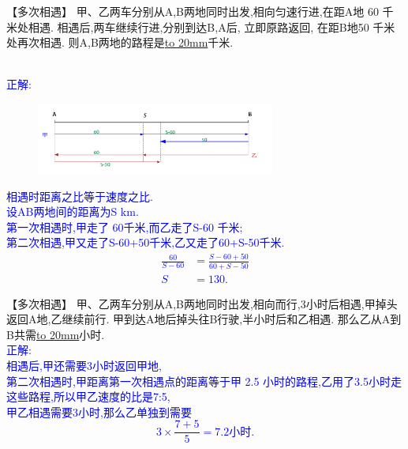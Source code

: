 \item {
    【多次相遇】
    甲、乙两车分别从A,B两地同时出发,相向匀速行进,在距A地 60 千米处相遇. 相遇后,两车继续行进,分别到达B,A后, 立即原路返回, 在距B地50 千米处再次相遇. 则A,B两地的路程是\underline{\hbox to 20mm{}}千米. 
    \ifshowSolution 
        \fangsong{}\textcolor{blue}{
            \\正解:
            \begin{figure}[H] 
                \centering
                \includegraphics[width=0.7\textwidth]{./pics/Chapter_3/seikai_3.png}
            \end{figure}
            相遇时距离之比等于速度之比.\\
            设AB两地间的距离为S km.\\
            第一次相遇时,甲走了 60千米,而乙走了S-60 千米; \\
            第二次相遇,甲又走了S-60+50千米,乙又走了60+S-50千米.\\
            \begin{align*}
                \frac{60}{S-60} &= \frac{S-60+50}{60+S-50} \\
                S&=130.
            \end{align*}
        }
    \else
        \vspace{2cm}
    \fi
}

\item {
    【多次相遇】
    甲、乙两车分别从A,B两地同时出发,相向而行,3小时后相遇,甲掉头返回A地,乙继续前行. 甲到达A地后掉头往B行驶,半小时后和乙相遇. 那么乙从A到B共需\underline{\hbox to 20mm{}}小时.
    \ifshowSolution 
        \fangsong{}\textcolor{blue}{
            \\正解:\\ 
                相遇后,甲还需要3小时返回甲地,\\
                第二次相遇时,甲距离第一次相遇点的距离等于甲 2.5 小时的路程,乙用了3.5小时走这些路程,所以甲乙速度的比是7:5,\\
                甲乙相遇需要3小时,那么乙单独到需要
                \[ 3\times \frac{7+5}{5} = 7.2小时.\]
        }
    \else
        \vspace{2cm}
    \fi
}

